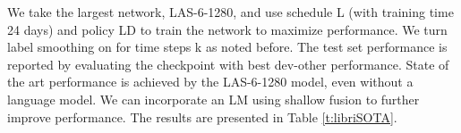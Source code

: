 \documentclass[a4paper]{article}
\begin{document}
\begin{table}[h!]
  \caption{LibriSpeech test WER (\%) evaluated for varying networks, schedules and policies. First row from \cite{irie-arxiv-2019}.}
  \footnotesize
  \label{t:LibriSpeech}
  \centering
\end{table}

We take the largest network, LAS-6-1280, and use schedule L (with training time  24 days) and policy LD to train the network to maximize performance. We turn label smoothing on for time steps k as noted before. The test set performance is reported by evaluating the checkpoint with best dev-other performance. State of the art performance is achieved by the LAS-6-1280 model, even without a language model. We can incorporate an LM using shallow fusion to further improve performance. The results are presented in Table \ref{t:libriSOTA}.
\end{document}
